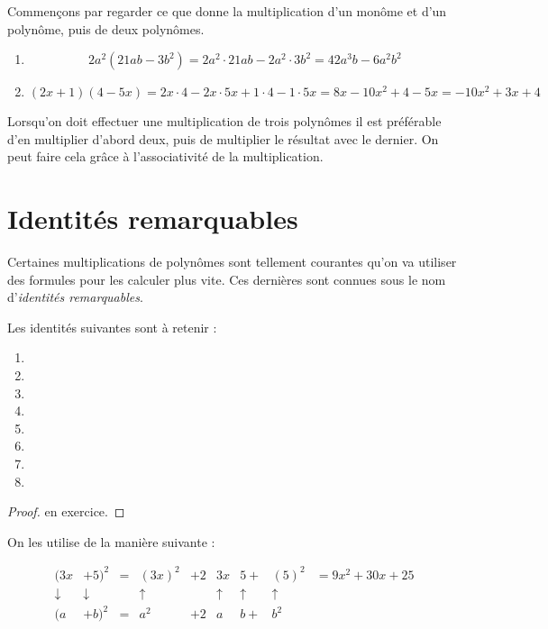 \begin{exemple}
Commençons par regarder ce que donne la multiplication d'un monôme et d'un polynôme, puis de deux polynômes.
\begin{enumerate}
\item 
$$
2a^2(21ab -3b^2) = 2a^2 \cdot 21ab - 2a^2 \cdot 3b^2 = 42a^3b - 6 a^2 b^2
$$
\item 
$$
(2x+1)(4-5x) = 2x \cdot 4 - 2x \cdot 5x + 1 \cdot 4 - 1 \cdot 5x = 8x - 10 x^2 + 4 - 5x = -10x^2 +3x + 4
$$
\end{enumerate}

\begin{remarque}
Lorsqu'on doit effectuer une multiplication de trois polynômes il est préférable d'en multiplier d'abord deux, puis de multiplier le résultat avec le dernier. On peut faire cela grâce à l'associativité de la multiplication.
\end{remarque}
\end{exemple}

\section{Identités remarquables} \label{identites}

Certaines multiplications de polynômes sont tellement courantes qu'on va utiliser des formules pour les calculer plus vite. Ces dernières sont connues sous le nom d'\emph{identités remarquables}.
\begin{theoreme}
Les identités suivantes sont à retenir :
\begin{enumerate}
\item {}
\item {}
\item {}
\item {}
\item {}
\item {}
\item {}
\item {}
\end{enumerate}
\end{theoreme}
\begin{proof}
en exercice.
\end{proof}
On les utilise de la manière suivante :
\begin{exemple}
$$
\begin{array}{ccccccccl}
(3x &+ 5)^2 & = & (3x)^2 & +2 &3x& 5 + & (5)^2 & = 9x^2 + 30 x + 25 \\
\downarrow & \downarrow & & \uparrow & & \uparrow &\uparrow & \uparrow &\\
(a & +b)^2 & = & a^2 & +2 & a & b + & b^2 &\\
\end{array}
$$
\end{exemple}

